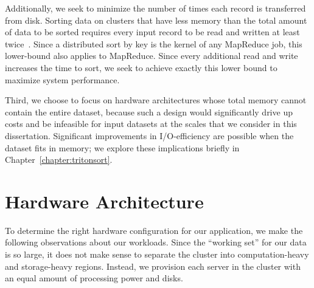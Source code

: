 Additionally, we seek to minimize the number of times each record is
transferred from disk.  Sorting data on clusters that have less memory than the
total amount of data to be sorted requires every input record to be read and
written at least twice~\cite{sort-io}.  Since a distributed sort by key is the
kernel of any MapReduce job, this lower-bound also applies to MapReduce. Since
every additional read and write increases the time to sort, we seek to achieve
exactly this lower bound to maximize system performance.

Third, we choose to focus on hardware architectures whose total memory cannot
contain the entire dataset, because such a design would significantly drive up
costs and be infeasible for input datasets at the scales that we consider in
this dissertation. Significant improvements in I/O-efficiency are possible when
the dataset fits in memory; we explore these implications briefly in
Chapter~\ref{chapter:tritonsort}.

\section{Hardware Architecture}
\label{sec:hardware_architecture}

To determine the right hardware configuration for our application, we make the
following observations about our workloads. Since the ``working set'' for our
data is so large, it does not make sense to separate the cluster into
computation-heavy and storage-heavy regions. Instead, we provision each server
in the cluster with an equal amount of processing power and disks.

